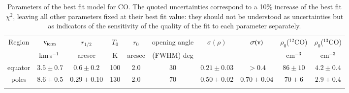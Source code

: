 \documentclass{aa}
\newcommand{\kms}{\,km\,s$^{-1}$~}
\begin{document}
\begin{table*}
  \caption{Parameters of the best fit model for CO. The quoted uncertainties
    correspond to a 10\% increase of the best fit $\chi^2$, leaving
    all other parameters fixed at their best fit value: they should
    not be understood as uncertainties but as indicators of the
    sensitivity of the quality of the fit to each parameter
    separately.}
  \begin{center}
  \begin{tabular}{cccccccccc}
    \hline
    \hline
  Region  & ${\rm v_{term}}$ & $r_{1/2}$       & $T_0$ & $r_0$  & opening angle & $\sigma(\rho)$ & $\sigma({\rm v})$ & $\rho_0$($^{12}$CO) & $\rho_0$($^{13}$CO) \\
          &   \kms          &  arcsec       &  K    & arcsec & (FWHM) deg   &                &                   & cm$^{-3}$           & cm$^{-3}$    \\
  \hline
  equator &$3.5\pm0.7$      & $0.6\pm0.2$   & 100   & 2.0    &  30           & $0.21\pm0.03$  & $>0.4$            & $86\pm10$   & $4.2\pm0.4$ \\
  poles   &$8.6\pm0.5$      & $0.29\pm0.10$ & 130   & 2.0    &  70           & $0.50\pm0.02$  & $0.70\pm0.04$     & $70\pm6$    & $2.9\pm0.4$ \\
  \hline
  \label{fitparatab}
  \end{tabular}
  \end{center}
\end{table*}
\end{document}

